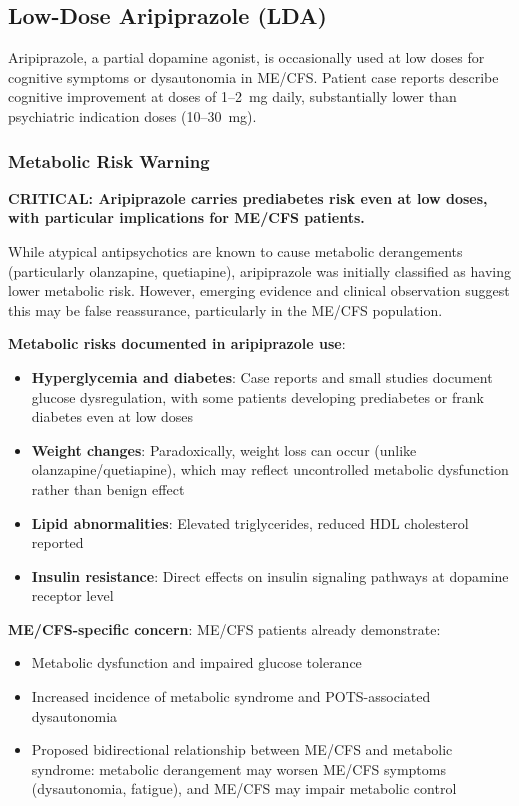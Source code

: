 \subsection{Low-Dose Aripiprazole (LDA)}

Aripiprazole, a partial dopamine agonist, is occasionally used at low doses for cognitive symptoms or dysautonomia in ME/CFS. Patient case reports describe cognitive improvement at doses of 1--2~mg daily, substantially lower than psychiatric indication doses (10--30~mg).

\subsubsection{Metabolic Risk Warning}

\begin{warning}
\label{warn:lda-metabolic}
\textbf{CRITICAL: Aripiprazole carries prediabetes risk even at low doses, with particular implications for ME/CFS patients.}

While atypical antipsychotics are known to cause metabolic derangements (particularly olanzapine, quetiapine), aripiprazole was initially classified as having lower metabolic risk. However, emerging evidence and clinical observation suggest this may be false reassurance, particularly in the ME/CFS population.

\textbf{Metabolic risks documented in aripiprazole use}:
\begin{itemize}
    \item \textbf{Hyperglycemia and diabetes}: Case reports and small studies document glucose dysregulation, with some patients developing prediabetes or frank diabetes even at low doses
    \item \textbf{Weight changes}: Paradoxically, weight loss can occur (unlike olanzapine/quetiapine), which may reflect uncontrolled metabolic dysfunction rather than benign effect
    \item \textbf{Lipid abnormalities}: Elevated triglycerides, reduced HDL cholesterol reported
    \item \textbf{Insulin resistance}: Direct effects on insulin signaling pathways at dopamine receptor level
\end{itemize}

\textbf{ME/CFS-specific concern}: ME/CFS patients already demonstrate:
\begin{itemize}
    \item Metabolic dysfunction and impaired glucose tolerance
    \item Increased incidence of metabolic syndrome and POTS-associated dysautonomia
    \item Proposed bidirectional relationship between ME/CFS and metabolic syndrome: metabolic derangement may worsen ME/CFS symptoms (dysautonomia, fatigue), and ME/CFS may impair metabolic control
\end{itemize}


\end{warning}
